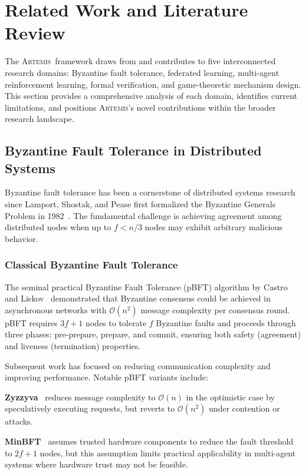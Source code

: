 \documentclass[conference]{IEEEtran}
\newcommand{\artemis}{\textsc{Artemis}}
\newcommand{\bigO}{\mathcal{O}}
\begin{document}
\section{Related Work and Literature Review}

The \artemis\ framework draws from and contributes to five interconnected research domains: Byzantine fault tolerance, federated learning, multi-agent reinforcement learning, formal verification, and game-theoretic mechanism design. This section provides a comprehensive analysis of each domain, identifies current limitations, and positions \artemis's novel contributions within the broader research landscape.

\subsection{Byzantine Fault Tolerance in Distributed Systems}

Byzantine fault tolerance has been a cornerstone of distributed systems research since Lamport, Shostak, and Pease first formalized the Byzantine Generals Problem in 1982~\cite{lamport1982byzantine}. The fundamental challenge is achieving agreement among distributed nodes when up to $f < n/3$ nodes may exhibit arbitrary malicious behavior.

\subsubsection{Classical Byzantine Fault Tolerance}

The seminal practical Byzantine Fault Tolerance (pBFT) algorithm by Castro and Liskov~\cite{castro1999practical} demonstrated that Byzantine consensus could be achieved in asynchronous networks with $\bigO(n^2)$ message complexity per consensus round. pBFT requires $3f+1$ nodes to tolerate $f$ Byzantine faults and proceeds through three phases: pre-prepare, prepare, and commit, ensuring both safety (agreement) and liveness (termination) properties.

Subsequent work has focused on reducing communication complexity and improving performance. Notable pBFT variants include:

\textbf{Zyzzyva}~\cite{kotla2009zyzzyva} reduces message complexity to $\bigO(n)$ in the optimistic case by speculatively executing requests, but reverts to $\bigO(n^2)$ under contention or attacks.

\textbf{MinBFT}~\cite{veronese2013minbft} assumes trusted hardware components to reduce the fault threshold to $2f+1$ nodes, but this assumption limits practical applicability in multi-agent systems where hardware trust may not be feasible.
\end{document}
